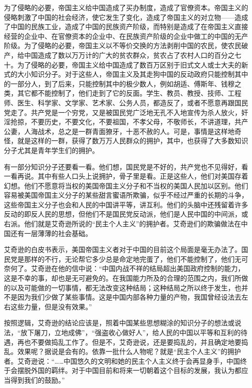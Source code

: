为了侵略的必要，帝国主义给中国造成了买办制度，造成了官僚资本。帝国主义的侵略刺激了中国的社会经济，使它发生了变化，造成了帝国主义的对立物——造成了中国的民族工业，造成了中国的民族资产阶级，而特别是造成了在帝国主义直接经营的企业中、在官僚资本的企业中、在民族资产阶级的企业中做工的中国的无产阶级。为了侵略的必要，帝国主义以不等价交换的方法剥削中国的农民，使农民破产，给中国造成了数以万万计的广大的贫农群众，贫农占了农村人口的百分之七十。为了侵略的必要，帝国主义给中国造成了数百万区别于旧式文人或士大夫的新式的大小知识分子。对于这些人，帝国主义及其走狗中国的反动政府只能控制其中的一部分人，到了后来，只能控制其中的极少数人，例如胡适、傅斯年、钱穆之类，其它都不能控制了，他们走到了它的反面。学生、教员、教授、技师、工程师、医生、科学家、文学家、艺术家、公务人员，都造反了，或者不愿意再跟国民党走了。共产党是一个穷党，又是被国民党广泛地无孔不入地宣传为杀人放火，奸淫抢掠，不要历史，不要文化，不要祖国，不孝父母，不敬师长，不讲道理，共产公妻，人海战术，总之是一群青面獠牙，十恶不赦的人。可是，事情是这样地奇怪，就是这样的一群，获得了数万万人民群众的拥护，其中，也获得了大多数知识分子尤其是青年学生们的拥护。

有一部分知识分子还要看一看。他们想，国民党是不好的，共产党也不见得好，看一看再说。其中有些人口头上说拥护，骨子里是看。正是这些人，他们对美国存着幻想。他们不愿意将当权的美国帝国主义分子和不当权的美国人民加以区别。他们容易被美国帝国主义分子的某些甜言蜜语所欺骗，似乎不经过严重的长期的斗争，这些帝国主义分子也会和人民的中国讲平等，讲互利。他们的头脑中还残留着许多反动的即反人民的思想，但他们不是国民党反动派，他们是人民中国的中间派，或右派。他们就是艾奇逊所说的“民主个人主义”的拥护者。艾奇逊们的欺骗做法在中国还有一层薄薄的社会基础。

艾奇逊的白皮书表示，美国帝国主义者对于中国的目前这个局面是毫无办法了。国民党是那样的不行，无论帮它多少总是命定地完蛋了，他们不能控制了，他们无可奈何了。艾奇逊在他的信中说：“中国内战不祥的结局超出美国政府控制的能力，这是不幸的事，却也是无可避免的。在我国能力所及的合理的范围之内，我们所做的以及可能做的一切事情，都无法改变这种结局；这种结局之所以终于发生，也并不是因为我们少做了某些事情。这是中国内部各种力量的产物，我国曾经设法去左右这些力量，但是没有效果。”

按照逻辑，艾奇逊的结论应该是，照着中国某些思想糊涂的知识分子的想法或说法，“放下屠刀，立地成佛”，“强盗收心做好人”，给人民的中国以平等和互利的待遇，再也不要做捣乱工作了。但是不，艾奇逊说，还是要捣乱的，并且确定地要捣乱。效果呢？据说是会有的。依靠一批什么人物呢？就是“民主个人主义”的拥护者。艾奇逊说：“……中国悠久的文明和她的民主个人主义终于会再显身手，中国终于会摆脱外国的羁绊。对于中国目前和将来一切朝着这个目标的发展，我认为都应当得到我们的鼓励。”

